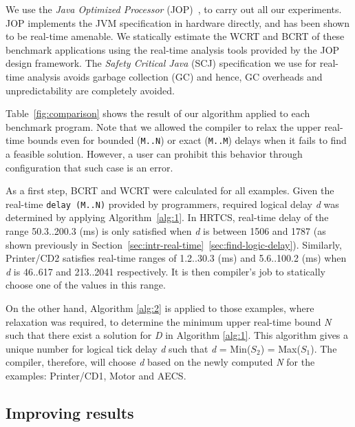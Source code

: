 We use the \textit{Java Optimized Processor}
(JOP)~\cite{jop:jnl:jsa2007}, to carry out all our experiments. JOP
implements the JVM specification in hardware directly, and has been
shown to be real-time amenable. We statically estimate the WCRT and BCRT
of these benchmark applications using the real-time analysis tools
provided by the JOP design framework. The \textit{Safety Critical Java}
(SCJ) specification we use for real-time analysis avoids garbage
collection (GC) and hence, GC overheads and unpredictability are
completely avoided. 


Table~\ref{fig:comparison} shows the result of our algorithm applied to
each benchmark program. Note that we allowed the compiler to relax the
upper real-time bounds even for bounded (\texttt{M..N}) or exact
(\texttt{M..M}) delays when it fails to find a feasible solution.
However, a user can prohibit this behavior through configuration that
such case is an error.

As a first step, BCRT and WCRT were calculated for all examples. Given
the real-time \mbox{\texttt{delay (M..N)}} provided by programmers,
required logical delay \textit{d} was determined by applying
Algorithm~\ref{alg:1}. In HRTCS, real-time delay of the range
50.3..200.3 (ms) is only satisfied when \emph{d} is between 1506 and
1787 (as shown previously in
Section~\ref{sec:intr-real-time}~\ref{sec:find-logic-delay}). Similarly,
Printer/CD2 satisfies real-time ranges of 1.2..30.3 (ms) and 5.6..100.2
(ms) when \emph{d} is 46..617 and 213..2041 respectively. It is then
compiler's job to statically choose one of the values in this range.

On the other hand, Algorithm \ref{alg:2} is applied to those examples,
where relaxation was required, to determine the minimum upper real-time
bound \emph{N} such that there exist a solution for \emph{D} in
Algorithm \ref{alg:1}. This algorithm gives a unique number for logical
tick delay \emph{d} such that \emph{d} = Min(\emph{$S_2$}) =
Max(\emph{$S_1$}). The compiler, therefore, will choose \emph{d} based
on the newly computed \emph{N} for the examples: Printer/CD1, Motor and
AECS.

\subsection{Improving results}

